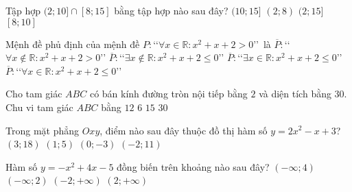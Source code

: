 \begin{ex}%
	Tập hợp $(2;10]\cap [8;15]$ bằng tập hợp nào sau đây?
	\choice
	{$(10;15]$}
	{$(2;8)$}
	{$(2;15]$}
	{\True $[8;10]$}
	\loigiai{
	Ta có $(2;10]\cap [8;15]=[8;10]$.
	}
\end{ex}
\begin{ex}%
	Mệnh đề phủ định của mệnh đề $P\colon$\lq\lq$\forall x\in\mathbb{R}:x^2+x+2>0$\rq\rq\, là
	\choice
	{$\overline{P}\colon$\lq\lq$\forall x\notin\mathbb{R}:x^2+x+2>0$\rq\rq}
	{\True $\overline{P}\colon$\lq\lq$\exists x\notin\mathbb{R}:x^2+x+2\le 0$\rq\rq}
	{$\overline{P}\colon$\lq\lq$\exists x\in\mathbb{R}:x^2+x+2\le 0$\rq\rq}
	{$\overline{P}\colon$\lq\lq$\forall x\in\mathbb{R}:x^2+x+2\le 0$\rq\rq}
\end{ex}
\begin{ex}%
	Cho tam giác $ABC$ có bán kính đường tròn nội tiếp bằng $2$ và diện tích bằng $30$. Chu vi tam giác $ABC$ bằng
	\choice
	{$12$}
	{$6$}
	{$15$}
	{\True $30$}
\end{ex}
\begin{ex}%
	Trong mặt phẳng $Oxy$, điểm nào sau đây thuộc đồ thị hàm số $y=2x^2-x+3$?
	\choice
	{\True $(3;18)$}
	{$(1;5)$}
	{$(0;-3)$}
	{$(-2;11)$}
\end{ex}
\begin{ex}%
	Hàm số $y=-x^2+4x-5$ đồng biến trên khoảng nào sau đây?
	\choice
	{$(-\infty;4)$}
	{\True $(-\infty;2)$}
	{$(-2;+\infty)$}
	{$(2;+\infty)$}
\end{ex}

